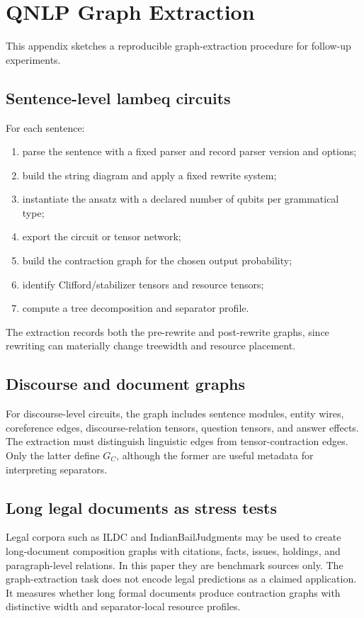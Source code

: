 \section{QNLP Graph Extraction}
\label{app:qnlp-extraction}

This appendix sketches a reproducible graph-extraction procedure for follow-up experiments.

\subsection{Sentence-level lambeq circuits}

For each sentence:
\begin{enumerate}[leftmargin=1.2cm]
\item parse the sentence with a fixed parser and record parser version and options;
\item build the string diagram and apply a fixed rewrite system;
\item instantiate the ansatz with a declared number of qubits per grammatical type;
\item export the circuit or tensor network;
\item build the contraction graph for the chosen output probability;
\item identify Clifford/stabilizer tensors and resource tensors;
\item compute a tree decomposition and separator profile.
\end{enumerate}

The extraction records both the pre-rewrite and post-rewrite graphs, since rewriting can materially change treewidth and resource placement.

\subsection{Discourse and document graphs}

For discourse-level circuits, the graph includes sentence modules, entity wires, coreference edges, discourse-relation tensors, question tensors, and answer effects. The extraction must distinguish linguistic edges from tensor-contraction edges. Only the latter define \(G_C\), although the former are useful metadata for interpreting separators.

\subsection{Long legal documents as stress tests}

Legal corpora such as ILDC and IndianBailJudgments may be used to create long-document composition graphs with citations, facts, issues, holdings, and paragraph-level relations. In this paper they are benchmark sources only. The graph-extraction task does not encode legal predictions as a claimed application. It measures whether long formal documents produce contraction graphs with distinctive width and separator-local resource profiles.
